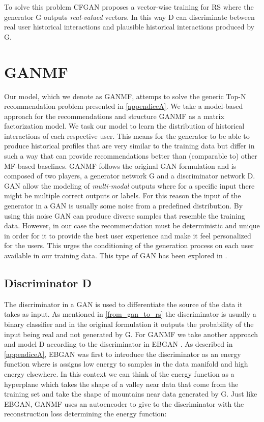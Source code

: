 To solve this problem CFGAN proposes a vector-wise training for RS where the generator G outputs \emph{real-valued} vectors. In this way D can discriminate between real user historical interactions and plausible historical interactions produced by G.

\section{GANMF}
\label{sec:GANMF}
Our model, which we denote as GANMF, attemps to solve the generic Top-N recommendation problem presented in \ref{appendiceA}. We take a model-based approach for the recommendations and structure GANMF as a matrix factorization model. We task our model to learn the distribution of historical interactions of each respective user. This means for the generator to be able to produce historical profiles that are very similar to the training data but differ in such a way that can provide recommendations better than (comparable to) other MF-based baselines. GANMF follows the original GAN formulation and is composed of two players, a generator network G and a discriminator network D. GAN allow the modeling of \emph{multi-modal} outputs \cite{goodfellow2016nips} where for a specific input there might be multiple correct outputs or labels. For this reason the input of the generator in a GAN is usually some noise from a predefined distribution. By using this noise GAN can produce diverse samples that resemble the training data. However, in our case the recommendation must be deterministic and unique in order for it to provide the best user experience and make it feel personalized for the users. This urges the conditioning of the generation process on each user available in our training data. This type of GAN has been explored in \cite{mirza2014conditional}.

\subsection{Discriminator D}
\label{sec:GANMF_D}
The discriminator in a GAN is used to differentiate the source of the data it takes as input. As mentioned in \ref{from_gan_to_rs} the discriminator is usually a binary classifier and in the original formulation it outputs the probability of the input being real and not generated by G. For GANMF we take another approach and model D according to the discriminator in EBGAN \cite{zhao2016energy}. As described in \ref{appendiceA}, EBGAN was first to introduce the discriminator as an energy function where is assigns low energy to samples in the data manifold and high energy elsewhere. In this context we can think of the energy function as a hyperplane which takes the shape of a valley near data that come from the training set and take the shape of mountains near data generated by G. Just like EBGAN, GANMF uses an autoencoder \cite{kramer1991nonlinear} to give to the discriminator with the reconstruction loss determining the energy function:

